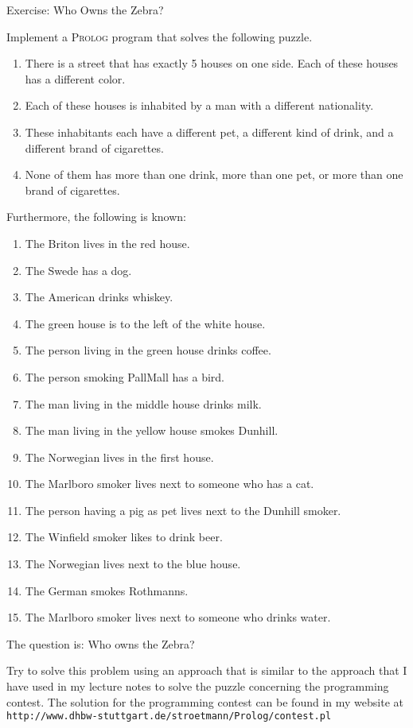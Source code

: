 \documentclass{article}
\begin{document}
\noindent
{\Large Exercise: Who Owns the Zebra?}
\vspace{0.5cm}

\noindent
Implement a \textsc{Prolog} program that solves the following puzzle.
\begin{enumerate}
\item There is a street that has exactly 5 houses on one side.
      Each of these houses has a different color.
\item Each of these houses is inhabited by a man with a different nationality.
\item These inhabitants each have a different pet, a different kind of drink, and a 
      different brand of cigarettes.
\item None of them has more than one drink, more than one pet, or more than one 
      brand of cigarettes.
\end{enumerate}
Furthermore, the following is known:
\begin{enumerate}
\item The Briton lives in the red house.
\item The Swede has a dog.
\item The American drinks whiskey. 
\item The green house is to the left of the white house.
\item The person living in the green house drinks coffee.
\item The person smoking  PallMall has a bird.
\item The man living in the middle house drinks milk.
\item The man living in the yellow house smokes Dunhill.
\item The Norwegian lives in the first house.
\item The Marlboro smoker lives next to someone who has a cat.
\item The person having a pig as pet lives next to the Dunhill smoker.
\item The Winfield smoker likes to drink beer.
\item The Norwegian lives next to the blue house.
\item The German smokes Rothmanns.
\item The Marlboro smoker lives next to someone who drinks water.
\end{enumerate}
The question is: Who owns the Zebra?
\vspace{0.5cm}

\noindent 
Try to solve this problem using an approach that is similar to the
approach that I have used in my lecture notes to solve the puzzle concerning the
programming contest.  The solution for the programming contest can be found in my website
at
\\[0.2cm]
\hspace*{1.3cm}
\texttt{http://www.dhbw-stuttgart.de/stroetmann/Prolog/contest.pl}
\end{document}
